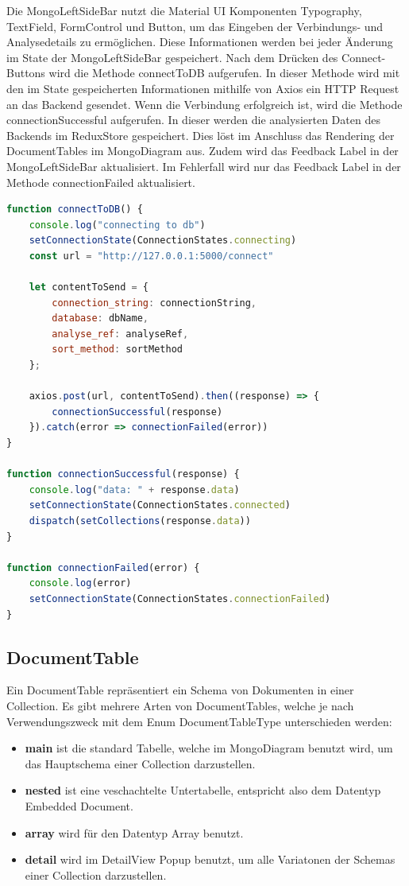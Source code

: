 Die  MongoLeftSideBar nutzt die Material UI Komponenten Typography, TextField, FormControl und Button, um das Eingeben der Verbindungs- und Analysedetails zu ermöglichen.
Diese Informationen werden bei jeder Änderung im State der MongoLeftSideBar gespeichert.
Nach dem Drücken des Connect-Buttons wird die Methode connectToDB aufgerufen.
In dieser Methode wird mit den im State gespeicherten Informationen mithilfe von Axios ein HTTP Request an das Backend gesendet.
Wenn die Verbindung erfolgreich ist, wird die Methode connectionSuccessful aufgerufen.
In dieser werden die analysierten Daten des Backends im ReduxStore gespeichert.
Dies löst im Anschluss das Rendering der DocumentTables im MongoDiagram aus.
Zudem wird das Feedback Label in der MongoLeftSideBar aktualisiert.
Im Fehlerfall wird nur das Feedback Label in der Methode connectionFailed aktualisiert.


\begin{lstlisting}[language=JavaScript, caption={MongoLeftSideBar.connectToDB},label={lst:mongo_left_side_bar_connect_to_db}]
function connectToDB() {
    console.log("connecting to db")
    setConnectionState(ConnectionStates.connecting)
    const url = "http://127.0.0.1:5000/connect"

    let contentToSend = {
        connection_string: connectionString,
        database: dbName,
        analyse_ref: analyseRef,
        sort_method: sortMethod
    };

    axios.post(url, contentToSend).then((response) => {
        connectionSuccessful(response)
    }).catch(error => connectionFailed(error))
}

function connectionSuccessful(response) {
    console.log("data: " + response.data)
    setConnectionState(ConnectionStates.connected)
    dispatch(setCollections(response.data))
}

function connectionFailed(error) {
    console.log(error)
    setConnectionState(ConnectionStates.connectionFailed)
}
\end{lstlisting}

\subsection{DocumentTable}
\label{sub:fe_document_table}

Ein DocumentTable repräsentiert ein Schema von Dokumenten in einer Collection.
Es gibt mehrere Arten von DocumentTables, welche je nach Verwendungszweck mit dem Enum DocumentTableType unterschieden werden:
\begin{itemize}
    \item \textbf{main} ist die standard Tabelle, welche im MongoDiagram benutzt wird, um das Hauptschema einer Collection darzustellen.
    \item \textbf{nested} ist eine veschachtelte Untertabelle, entspricht also dem Datentyp Embedded Document.
    \item \textbf{array} wird für den Datentyp Array benutzt.
    \item \textbf{detail} wird im DetailView Popup benutzt, um alle Variatonen der Schemas einer Collection darzustellen.
\end{itemize}

